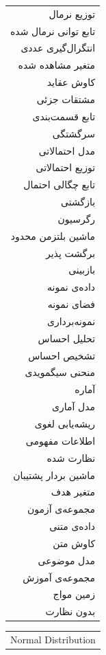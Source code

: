 \begin{table}[!t]	
\begin{minipage}{0.5\textwidth}
	\begin{tabular}{r}
		توزیع نرمال\\
		تابع توانی‌ نرمال شده\\
		انتگرال‌گیری عددی\\
		متغیر مشاهده شده\\
		کاوش عقاید\\
		مشتقات جزئی\\
		تابع قسمت‌بندی\\
		سرگشتگی\\
		مدل احتمالاتی\\
		توزیع احتمالاتی\\
		تابع چگالی احتمال\\
		بازگشتی\\
		رگرسیون\\
		ماشین بلتزمن محدود\\
		برگشت پذیر\\
		بازبینی\\
		داده‌ی نمونه\\
		فضای نمونه\\
		نمونه‌برداری\\
		تحلیل احساس\\
		تشخیص احساس\\
		منحنی سیگمویدی\\
		آماره\\
		مدل آماری\\
		ریشه‌یابی‌ لغوی\\
		اطلاعات مفهومی\\
		نظارت شده\\
		ماشین بردار پشتیبان\\
		متغیر هدف\\
		مجموعه‌ی آزمون\\
		داده‌ی متنی\\
		کاوش متن\\
		مدل موضوعی\\
		مجموعه‌ی آموزش\\
		زمین مواج\\
		بدون نظارت\\ 
	\end{tabular}
\end{minipage}	
\begin{minipage}[c]{0.5\textwidth}	
\begin{latin}	
	\begin{tabular}{l}
		Normal Distribution\\ 

\end{tabular}
\end{latin}
\end{minipage}
\end{table}
